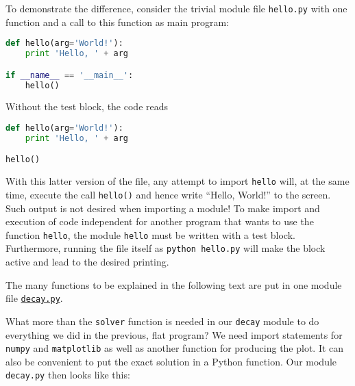 \documentclass[graybox,sectrefs,envcountresetchap,open=right,final]{svmonodo}
\newenvironment{notice_mdfboxadmon}[1][]{
\begin{notice_mdfboxmdframed}[frametitle=#1]
}
{
\end{notice_mdfboxmdframed}
}
\begin{document}
To demonstrate the difference, consider the trivial module
file \texttt{hello.py} with one function and a call to this function as main program:







\begin{lstlisting}[language=python,style=blue1bar_bluegreen]
def hello(arg='World!'):
    print 'Hello, ' + arg

if __name__ == '__main__':
    hello()

\end{lstlisting}

Without the test block, the code reads






\begin{lstlisting}[language=python,style=blue1bar_bluegreen]
def hello(arg='World!'):
    print 'Hello, ' + arg

hello()

\end{lstlisting}

With this latter version of the file, any attempt to import \texttt{hello}
will, at the same time, execute the call \texttt{hello()} and hence write
``Hello, World!'' to the screen.  Such output is not desired when
importing a module!  To make import and execution of code independent
for another program that wants to use the function \texttt{hello}, the module
\texttt{hello} must be written with a test block. Furthermore, running the
file itself as \texttt{python hello.py} will make the block active and lead
to the desired printing.


\begin{notice_mdfboxadmon}
The many functions to be explained in the following text are
put in one module file \href{{http://tinyurl.com/ofkw6kc/softeng/decay.py}}{\nolinkurl{decay.py}}.
\end{notice_mdfboxadmon} %



What more than the \texttt{solver} function is needed in our \texttt{decay} module
to do everything we did in the previous, flat program?  We need import
statements for \texttt{numpy} and \texttt{matplotlib} as well as another function
for producing the plot. It can also be convenient to put the exact
solution in a Python function.  Our module \texttt{decay.py} then looks like
this:
\end{document}
